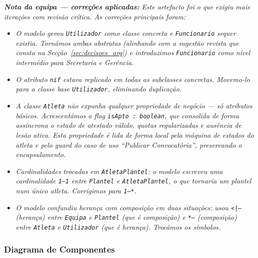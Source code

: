 \noindent\textit{\textbf{Nota da equipa --- correções aplicadas:} Este artefacto foi o que exigiu mais iterações com revisão crítica. As correções principais foram:}
\begin{itemize}
    \item \textit{O modelo gerou \texttt{Utilizador} como classe concreta e \texttt{Funcionario} sequer existia. Tornámos ambas abstratas (alinhando com a sugestão revista que consta na Secção~\ref{sec:decisoes_arq}) e introduzimos \texttt{Funcionario} como nível intermédio para Secretaria e Gerência.}
    \item \textit{O atributo \texttt{nif} estava replicado em todas as subclasses concretas. Movemo-lo para a classe base \texttt{Utilizador}, eliminando duplicação.}
    \item \textit{A classe \texttt{Atleta} não expunha qualquer propriedade de negócio --- só atributos básicos. Acrescentámos a flag \texttt{isApto : boolean}, que consolida de forma assíncrona o estado de atestado válido, quotas regularizadas e ausência de lesão ativa. Esta propriedade é lida de forma local pela máquina de estados do atleta e pelo \textit{guard} do caso de uso ``Publicar Convocatória'', preservando o encapsulamento.}
    \item \textit{Cardinalidades trocadas em \texttt{AtletaPlantel}: o modelo escreveu uma cardinalidade \texttt{1--1} entre \texttt{Plantel} e \texttt{AtletaPlantel}, o que tornaria um plantel num único atleta. Corrigimos para \texttt{1--*}.}
    \item \textit{O modelo confundiu herança com composição em duas situações: usou \texttt{<|--} (herança) entre \texttt{Equipa} e \texttt{Plantel} (que é composição) e \texttt{*--} (composição) entre \texttt{Atleta} e \texttt{Utilizador} (que é herança). Trocámos os símbolos.}
\end{itemize}

\subsubsection*{Diagrama de Componentes}


